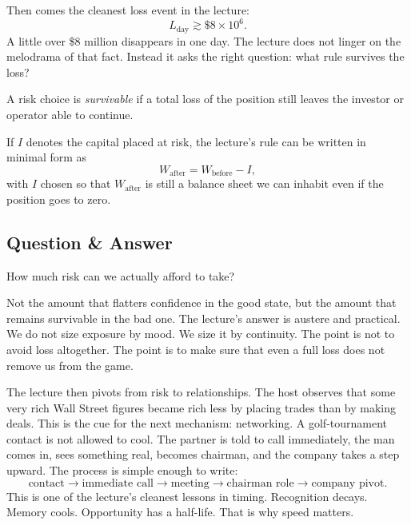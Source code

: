 Then comes the cleanest loss event in the lecture:
\begin{equation}
L_{\mathrm{day}} \gtrsim \$8\times 10^{6}.
\end{equation}
A little over \$8 million disappears in one day. The lecture does not linger on the melodrama of that fact. Instead it asks the right question: what rule survives the loss?

\begin{definition}
A risk choice is \emph{survivable} if a total loss of the position still leaves the investor or operator able to continue.
\end{definition}

If \(I\) denotes the capital placed at risk, the lecture's rule can be written in minimal form as
\begin{equation}
W_{\mathrm{after}} = W_{\mathrm{before}} - I,
\end{equation}
with \(I\) chosen so that \(W_{\mathrm{after}}\) is still a balance sheet we can inhabit even if the position goes to zero.

\subsection{Question \& Answer}

How much risk can we actually afford to take?

Not the amount that flatters confidence in the good state, but the amount that remains survivable in the bad one. The lecture's answer is austere and practical. We do not size exposure by mood. We size it by continuity. The point is not to avoid loss altogether. The point is to make sure that even a full loss does not remove us from the game.

The lecture then pivots from risk to relationships. The host observes that some very rich Wall Street figures became rich less by placing trades than by making deals. This is the cue for the next mechanism: networking. A golf-tournament contact is not allowed to cool. The partner is told to call immediately, the man comes in, sees something real, becomes chairman, and the company takes a step upward. The process is simple enough to write:
\begin{equation}
\text{contact} \to \text{immediate call} \to \text{meeting} \to \text{chairman role} \to \text{company pivot}.
\end{equation}
This is one of the lecture's cleanest lessons in timing. Recognition decays. Memory cools. Opportunity has a half-life. That is why speed matters.


